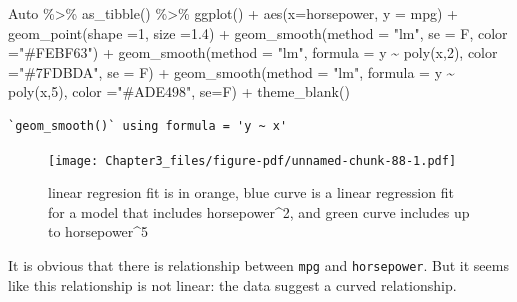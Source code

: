 \documentclass[
  letterpaper,
  DIV=11,
  numbers=noendperiod]{scrreprt}
\newenvironment{Shaded}{\begin{snugshade}}{\end{snugshade}}
\newcommand{\AttributeTok}[1]{\textcolor[rgb]{0.65,0.35,0.00}{#1}}
\newcommand{\DecValTok}[1]{\textcolor[rgb]{0.47,0.16,0.63}{#1}}
\newcommand{\FloatTok}[1]{\textcolor[rgb]{0.65,0.35,0.00}{#1}}
\newcommand{\FunctionTok}[1]{\textcolor[rgb]{0.02,0.16,0.49}{#1}}
\newcommand{\NormalTok}[1]{\textcolor[rgb]{0.33,0.33,0.33}{#1}}
\newcommand{\SpecialCharTok}[1]{\textcolor[rgb]{0.00,0.46,0.62}{#1}}
\newcommand{\StringTok}[1]{\textcolor[rgb]{0.00,0.50,0.00}{#1}}
\begin{document}
\begin{Shaded}
\begin{Highlighting}[]
\NormalTok{Auto }\SpecialCharTok{\%\textgreater{}\%} \FunctionTok{as\_tibble}\NormalTok{() }\SpecialCharTok{\%\textgreater{}\%} 
  \FunctionTok{ggplot}\NormalTok{() }\SpecialCharTok{+} \FunctionTok{aes}\NormalTok{(}\AttributeTok{x=}\NormalTok{horsepower, }\AttributeTok{y =}\NormalTok{ mpg) }\SpecialCharTok{+} \FunctionTok{geom\_point}\NormalTok{(}\AttributeTok{shape =}\DecValTok{1}\NormalTok{, }\AttributeTok{size =}\FloatTok{1.4}\NormalTok{) }\SpecialCharTok{+} 
  \FunctionTok{geom\_smooth}\NormalTok{(}\AttributeTok{method =} \StringTok{"lm"}\NormalTok{, }\AttributeTok{se =}\NormalTok{ F, }\AttributeTok{color =}\StringTok{"\#FEBF63"}\NormalTok{) }\SpecialCharTok{+}
  \FunctionTok{geom\_smooth}\NormalTok{(}\AttributeTok{method =} \StringTok{"lm"}\NormalTok{, }\AttributeTok{formula =}\NormalTok{ y }\SpecialCharTok{\textasciitilde{}} \FunctionTok{poly}\NormalTok{(x,}\DecValTok{2}\NormalTok{), }\AttributeTok{color =}\StringTok{"\#7FDBDA"}\NormalTok{, }\AttributeTok{se =}\NormalTok{ F) }\SpecialCharTok{+}
  \FunctionTok{geom\_smooth}\NormalTok{(}\AttributeTok{method =} \StringTok{"lm"}\NormalTok{, }\AttributeTok{formula =}\NormalTok{ y }\SpecialCharTok{\textasciitilde{}} \FunctionTok{poly}\NormalTok{(x,}\DecValTok{5}\NormalTok{), }\AttributeTok{color =}\StringTok{"\#ADE498"}\NormalTok{, }\AttributeTok{se=}\NormalTok{F) }\SpecialCharTok{+} \FunctionTok{theme\_blank}\NormalTok{() }
\end{Highlighting}
\end{Shaded}

\begin{verbatim}
`geom_smooth()` using formula = 'y ~ x'
\end{verbatim}

\begin{figure}[H]

{\centering \texttt{[image: Chapter3\_files/figure-pdf/unnamed-chunk-88-1.pdf]}

}

\caption{linear regresion fit is in orange, blue curve is a linear
regression fit for a model that includes horsepower\^{}2, and green
curve includes up to horsepower\^{}5}

\end{figure}

It is obvious that there is relationship between \texttt{mpg} and
\texttt{horsepower}. But it seems like this relationship is not linear:
the data suggest a curved relationship.
\end{document}
